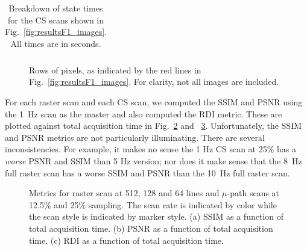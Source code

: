 \documentclass[twocolumn,oneside]{IEEEtran/IEEEtran}
\begin{document}
\begin{table}[t!]
  \centering
  \caption{Breakdown of state times for the CS scans shown in
    Fig.~\ref{fig:resultsF1_images}. All times are in seconds.}
  \label{tab:final_state_times}
  \begin{tabular}{ccccccc}
    
  \end{tabular}
\end{table}

\begin{figure}
  
  \caption{Rows of pixels, as indicated by the red lines in
    Fig.~\ref{fig:resultsF1_images}. For clarity, not all images are
    included.}
  \label{fig:pixel_rows}
\end{figure}
For each raster scan and each CS scan, we computed the SSIM and PSNR
 using the 1~Hz scan as the master and
also computed the RDI metric. These are plotted against total acquisition time
in Fig.~\ref{fig:time_ssim} and ~\ref{fig:time_psnr}.
Unfortunately, the SSIM and PSNR metrics are not particularly
illuminating. There are several inconsistencies. For example, it makes no sense
the 1 Hz CS scan at 25\% has a \emph{worse} PSNR and SSIM than 5 Hz version;
nor does it make sense that the 8~Hz full raster scan has a worse SSIM and PSNR than
the 10~Hz full raster scan.

\begin{figure}[t!]
  \centering
  \begin{subfigure}{0.329\linewidth}
    \centering
    
    \caption{}
    \label{fig:time_ssim}
  \end{subfigure}
  \begin{subfigure}{0.329\linewidth}
    \centering
    
    \caption{}
    \label{fig:time_psnr}
  \end{subfigure}
  \begin{subfigure}{0.329\linewidth}
    \centering
    
    \caption{}
    \label{fig:time_damage}
  \end{subfigure}
  \caption{Metrics for raster scan at 512, 128 and 64 lines and
    $\mu$-path scans at 12.5\% and 25\% sampling. The scan rate is
    indicated by color while the scan style is indicated by marker
    style. (a) SSIM as a function of total acquisition time. (b) PSNR
    as a function of total acquisition time. (c) RDI as a function of
    total acquisition time.}
  \label{fig:time_vs_metrics}
\end{figure}
\end{document}
